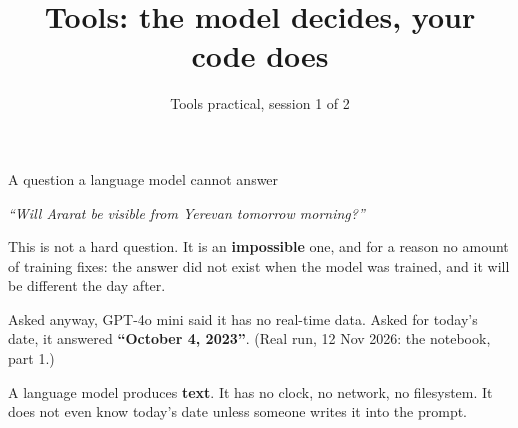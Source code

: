 \documentclass[aspectratio=169]{beamer}
\title{Tools: the model decides, your code does}
\subtitle{Tools practical, session 1 of 2}
\author{}
\date{}
\newcommand{\keybox}[1]{%
  \begin{tcolorbox}[colback=armblue!8, colframe=armblue, boxrule=0.6pt, arc=2pt]
  #1
  \end{tcolorbox}}
\begin{document}
\begin{frame}[plain]
  \titlepage
\end{frame}

\begin{frame}{A question a language model cannot answer}
  \vspace{0.8em}
  \begin{center}
  \begin{tcolorbox}[colback=lightbg, colframe=gray, boxrule=0.5pt, arc=2pt, width=0.8\textwidth]
    \centering\textit{``Will Ararat be visible from Yerevan tomorrow morning?''}
  \end{tcolorbox}
  \end{center}

  \vspace{0.8em}
  This is not a hard question. It is an \textbf{impossible} one, and for a reason no amount of
  training fixes: the answer did not exist when the model was trained, and it will be different
  the day after.

  \vspace{0.6em}
  {\small Asked anyway, GPT-4o mini said it has no real-time data. Asked for today's date, it answered
  \textbf{``October 4, 2023''}. {\color{gray}(Real run, 12 Nov 2026: the notebook, part 1.)}}

  \vspace{0.6em}
  \keybox{A language model produces \textbf{text}. It has no clock, no network, no filesystem. It
  does not even know today's date unless someone writes it into the prompt.}
\end{frame}
\end{document}
